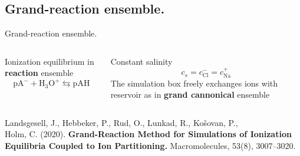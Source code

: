 \documentclass[10pt]{beamer}
\begin{document}
\subsection{Grand-reaction ensemble.}

{
\begin{frame}{Grand-reaction ensemble.}
\begin{columns}[T,onlytextwidth]%
\vspace{4.5cm}
Ionization equilibrium in \textbf{reaction} ensemble
\begin{equation*}
	\boxed{
		\mathrm{pA^- + H_3O^+ \leftrightarrows pAH}
	}
\end{equation*}

Constant salinity 
\begin{equation*}
\boxed{c_s = c_\mathrm{Cl}^- = c_\mathrm{Na}^+}
\end{equation*}
The simulation box freely 
exchanges ions with reservoir as in \textbf{grand cannonical} ensemble
\end{columns} %
\vspace{0.5cm}
{\scriptsize Landsgesell, J., Hebbeker, P., Rud, O., Lunkad, R., Košovan, P., \\ Holm, C. (2020). 
{\bf Grand-Reaction Method for Simulations of Ionization \\
Equilibria Coupled to Ion Partitioning. }
Macromolecules, 53(8), 3007–3020. }
\end{frame}
}
\end{document}
